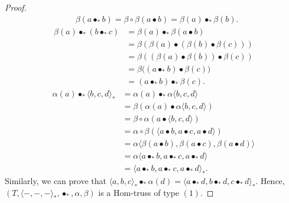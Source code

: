 \documentclass[14pt]{article}
\theoremstyle{Definition}
\theoremstyle{remark}
\begin{document}
\begin{proof}
\begin{align*}
&\beta(a\bullet_{\ast}b)=\beta\circ\beta(a\bullet b)=\beta(a)\bullet_{\ast}\beta(b).
\end{align*}
\begin{align*}
\beta(a)\bullet_{\ast}(b\bullet_{\ast}c)&=\beta(a)\bullet_{\ast}\beta(a\bullet b)\\
&=\beta(\beta(a)\bullet(\beta(b)\bullet \beta(c)))\\
&=\beta((\beta(a)\bullet\beta(b))\bullet\beta(c))\\
&=\beta\big((a\bullet_{\ast}b)\bullet\beta(c)\big)\\
&=(a\bullet_{\ast} b)\bullet_{\ast}\beta(c).
\end{align*}
\begin{align*}
\alpha(a)\bullet_{\ast}\langle b,c,d\rangle_{\ast}&=\alpha(a)\bullet_{\ast}\alpha\langle b,c,d\rangle\\
&=\beta(\alpha(a)\bullet\alpha\langle b,c,d\rangle)\\
&=\beta\circ\alpha(a\bullet\langle b,c,d\rangle)\\
&=\alpha\circ\beta(\langle a\bullet b,a\bullet c,a\bullet d\rangle)\\
&=\alpha\langle\beta(a\bullet b),\beta(a\bullet c),\beta(a\bullet d)\rangle\\
&=\alpha\langle a\bullet_{\ast}b,a\bullet_{\ast}c,a\bullet_{\ast}d\rangle\\
&=\langle a\bullet_{\ast}b,a\bullet_{\ast}c,a\bullet_{\ast}d\rangle_{\ast}.
\end{align*}
Similarly, we can prove that $\langle a,b,c\rangle_{\ast}\bullet_{\ast}\alpha(d)=\langle a\bullet_{\ast}d,b\bullet_{\ast}d,c\bullet_{\ast}d\rangle_{\ast}$. Hence, $(T,\langle-,-,-\rangle_{\ast},\bullet_{\ast},\alpha,\beta)$ is a Hom-truss of type $(1)$.
 \end{proof}
 
\end{document}
